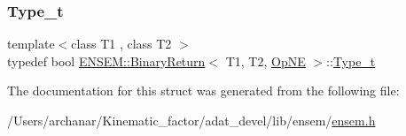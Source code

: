 \mbox{\label{structENSEM_1_1BinaryReturn_3_01T1_00_01T2_00_01OpNE_01_4_a9da65a077e200526d6270d806c19dcd6}} 
\subsubsection{\texorpdfstring{Type\_t}{Type\_t}\hspace{0.1cm}{\footnotesize\ttfamily [2/2]}}
{\footnotesize\ttfamily template$<$class T1 , class T2 $>$ \\
typedef bool \mbox{\hyperlink{structENSEM_1_1BinaryReturn}{E\+N\+S\+E\+M\+::\+Binary\+Return}}$<$ T1, T2, \mbox{\hyperlink{structENSEM_1_1OpNE}{Op\+NE}} $>$\+::\mbox{\hyperlink{structENSEM_1_1BinaryReturn_3_01T1_00_01T2_00_01OpNE_01_4_a9da65a077e200526d6270d806c19dcd6}{Type\+\_\+t}}}



The documentation for this struct was generated from the following file\+:\begin{DoxyCompactItemize}
\item 
/\+Users/archanar/\+Kinematic\+\_\+factor/adat\+\_\+devel/lib/ensem/\mbox{\hyperlink{lib_2ensem_2ensem_8h}{ensem.\+h}}\end{DoxyCompactItemize}
